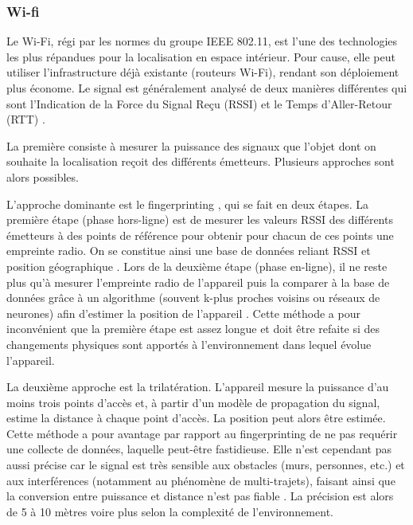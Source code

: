 \documentclass[11pt, a4paper]{article}
\begin{document}
\subsubsection{Wi-fi}

Le Wi-Fi, régi par les normes du groupe IEEE 802.11, est l’une des technologies les plus répandues pour la localisation en espace intérieur. Pour cause, elle peut utiliser l’infrastructure déjà existante (routeurs Wi-Fi), rendant son déploiement plus économe. Le signal est généralement analysé de deux manières différentes qui sont l’Indication de la Force du Signal Reçu (RSSI) et le Temps d’Aller-Retour (RTT) \cite{daiSurveyLatestWiFi2023}. 

La première consiste à mesurer la puissance des signaux que l’objet dont on souhaite la localisation reçoit des différents émetteurs. Plusieurs approches sont alors possibles.

L’approche dominante est le fingerprinting \cite{shangOverviewWiFiFingerprintingbased2022}, qui se fait en deux étapes. La première étape (phase hors-ligne) est de mesurer les valeurs RSSI des différents émetteurs à des points de référence pour obtenir pour chacun de ces points une empreinte radio. On se constitue ainsi une base de données reliant RSSI et position géographique \cite{heWiFiFingerprintBasedIndoor2016}. Lors de la deuxième étape (phase en-ligne), il ne reste plus qu’à mesurer l’empreinte radio de l’appareil puis la comparer à la base de données grâce à un algorithme (souvent k-plus proches voisins ou réseaux de neurones) afin d’estimer la position de l’appareil \cite{heWiFiFingerprintBasedIndoor2016}. Cette méthode a pour inconvénient que la première étape est assez longue et doit être refaite si des changements physiques sont apportés à l’environnement dans lequel évolue l’appareil.

La deuxième approche est la trilatération. L’appareil mesure la puissance d’au moins trois points d’accès et, à partir d’un modèle de propagation du signal, estime la distance à chaque point d’accès. La position peut alors être estimée. Cette méthode a pour avantage par rapport au fingerprinting de ne pas requérir une collecte de données, laquelle peut-être fastidieuse. Elle n’est cependant pas aussi précise car le signal est très sensible aux obstacles (murs, personnes, etc.) et aux interférences (notamment au phénomène de multi-trajets), faisant ainsi que la conversion entre puissance et distance n’est pas fiable \cite{liuSurveyWirelessIndoor2007}. La précision est alors de 5 à 10 mètres voire plus selon la complexité de l’environnement.
\end{document}
